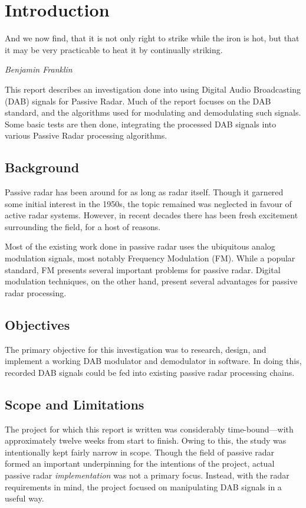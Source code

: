 \documentclass[class=report,11pt,crop=false]{standalone}
\begin{document}
\chapter{Introduction}
\epigraph{And we now find, that it is not only right to strike while the iron is hot, but that it may be very practicable to heat it by continually striking.}%
    {\emph{Benjamin Franklin}}

This report describes an investigation done into using Digital Audio Broadcasting (DAB) signals for Passive Radar. Much of the report focuses on the DAB standard, and the algorithms used for modulating and demodulating such signals. Some basic tests are then done, integrating the processed DAB signals into various Passive Radar processing algorithms.

\section{Background}
Passive radar has been around for as long as radar itself. Though it garnered some initial interest in the 1950s, the topic remained was neglected in favour of active radar systems. However, in recent decades there has been fresh excitement surrounding the field, for a host of reasons.

Most of the existing work done in passive radar uses the ubiquitous analog modulation signals, most notably Frequency Modulation (FM). While a popular standard, FM presents several important problems for passive radar. Digital modulation techniques, on the other hand, present several advantages for passive radar processing.

\section{Objectives}
The primary objective for this investigation was to research, design, and implement a working DAB modulator and demodulator in software. In doing this, recorded DAB signals could be fed into existing passive radar processing chains. 

\section{Scope and Limitations}
The project for which this report is written was considerably time-bound---with approximately twelve weeks from start to finish. Owing to this, the study was intentionally kept fairly narrow in scope. Though the field of passive radar formed an important underpinning for the intentions of the project, actual passive radar \emph{implementation} was not a primary focus. Instead, with the radar requirements in mind, the project focused on manipulating DAB signals in a useful way.
\end{document}
